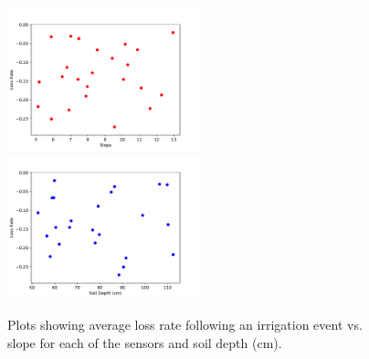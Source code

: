 \documentclass[12pt]{scrartcl}
\begin{document}
\begin{figure}[!htb]
    \centering
    \includegraphics[width=0.495\textwidth]{figures/slope_loss.pdf}
    \includegraphics[width=0.495\textwidth]{figures/soil_depth_loss.pdf}
    \caption{Plots showing average loss rate following an irrigation event vs. slope for each of the sensors and soil depth (cm).}
    \label{fig:slope}
\end{figure}
\end{document}
